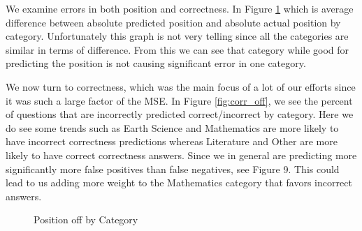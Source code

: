 \documentclass[letterpaper]{article}
\begin{document}
We examine errors in both position and correctness.  In Figure \ref{fig:abs_off} which is average difference between absolute predicted position and absolute actual position by category.  Unfortunately this graph is not very telling since all the categories are similar in terms of difference.  From this we can see that category while good for predicting the position is not causing significant error in one category.

We now turn to correctness, which was the main focus of a lot of our efforts since it was such a large factor of the MSE.  In Figure \ref{fig:corr_off}, we see the percent of questions that are incorrectly predicted correct/incorrect by category.  Here we do see some trends such as Earth Science and Mathematics are more likely to have incorrect correctness predictions whereas Literature and Other are more likely to have correct correctness answers.  Since we in general are predicting more significantly more false positives than false negatives, see Figure 9.  This could lead to us adding more weight to the Mathematics category that favors incorrect answers.  



\begin{figure}[H]
	\begin{center}
	\end{center}
	\caption{Position off by Category}
	\label{fig:abs_off}
\end{figure}
\end{document}
